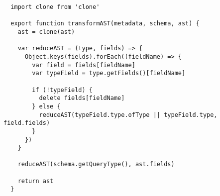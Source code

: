 \begin{verbatim}
  import clone from 'clone'

  export function transformAST(metadata, schema, ast) {
    ast = clone(ast)

    var reduceAST = (type, fields) => {
      Object.keys(fields).forEach((fieldName) => {
        var field = fields[fieldName]
        var typeField = type.getFields()[fieldName]

        if (!typeField) {
          delete fields[fieldName]
        } else {
          reduceAST(typeField.type.ofType || typeField.type, field.fields)
        }
      })
    }

    reduceAST(schema.getQueryType(), ast.fields)

    return ast
  }
\end{verbatim}
